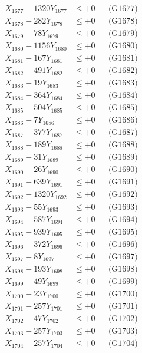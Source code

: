 \documentclass[a4paper,10pt]{article}
\begin{document}
{\begin{align}
X_{1677} - 1320Y_{1677} &\leq +0 && \text{(G1677)} \\
X_{1678} - 282Y_{1678} &\leq +0 && \text{(G1678)} \\
X_{1679} - 78Y_{1679} &\leq +0 && \text{(G1679)} \\
X_{1680} - 1156Y_{1680} &\leq +0 && \text{(G1680)} \\
\allowbreak
X_{1681} - 167Y_{1681} &\leq +0 && \text{(G1681)} \\
X_{1682} - 491Y_{1682} &\leq +0 && \text{(G1682)} \\
X_{1683} - 19Y_{1683} &\leq +0 && \text{(G1683)} \\
X_{1684} - 364Y_{1684} &\leq +0 && \text{(G1684)} \\
X_{1685} - 504Y_{1685} &\leq +0 && \text{(G1685)} \\
X_{1686} - 7Y_{1686} &\leq +0 && \text{(G1686)} \\
X_{1687} - 377Y_{1687} &\leq +0 && \text{(G1687)} \\
X_{1688} - 189Y_{1688} &\leq +0 && \text{(G1688)} \\
X_{1689} - 31Y_{1689} &\leq +0 && \text{(G1689)} \\
X_{1690} - 26Y_{1690} &\leq +0 && \text{(G1690)} \\
\allowbreak
X_{1691} - 639Y_{1691} &\leq +0 && \text{(G1691)} \\
X_{1692} - 1320Y_{1692} &\leq +0 && \text{(G1692)} \\
X_{1693} - 55Y_{1693} &\leq +0 && \text{(G1693)} \\
X_{1694} - 587Y_{1694} &\leq +0 && \text{(G1694)} \\
X_{1695} - 939Y_{1695} &\leq +0 && \text{(G1695)} \\
X_{1696} - 372Y_{1696} &\leq +0 && \text{(G1696)} \\
X_{1697} - 8Y_{1697} &\leq +0 && \text{(G1697)} \\
X_{1698} - 193Y_{1698} &\leq +0 && \text{(G1698)} \\
X_{1699} - 49Y_{1699} &\leq +0 && \text{(G1699)} \\
X_{1700} - 23Y_{1700} &\leq +0 && \text{(G1700)} \\
\allowbreak
X_{1701} - 257Y_{1701} &\leq +0 && \text{(G1701)} \\
X_{1702} - 47Y_{1702} &\leq +0 && \text{(G1702)} \\
X_{1703} - 257Y_{1703} &\leq +0 && \text{(G1703)} \\
X_{1704} - 257Y_{1704} &\leq +0 && \text{(G1704)} \\

\end{align}}
\end{document}
